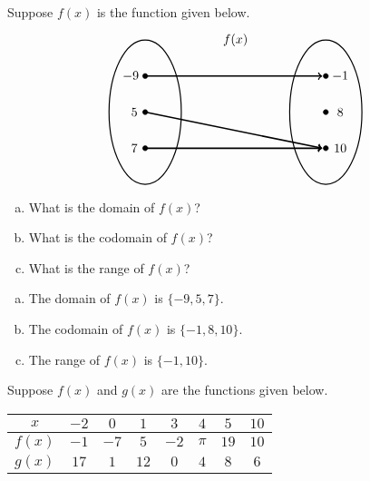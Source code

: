 \documentclass[11pt,letterpaper]{article}
\begin{document}
 Suppose $f(x)$ is the function given below.
	\[
	\begin{tikzpicture}
	\node at (2.5,2) {$f(x)$};
	\draw[line width=0.03cm] (0,0) circle (1 and 2);
	\draw[line width=0.03cm] (5,0) circle (1 and 2);
	
	\draw[fill=black] (0,1) circle (0.07);
	\draw[fill=black] (0,0) circle (0.07);
	\draw[fill=black] (0,-1) circle (0.07);
	
	\draw[fill=black] (5,1) circle (0.07);
	\draw[fill=black] (5,0) circle (0.07);
	\draw[fill=black] (5,-1) circle (0.07);
	
	\draw[line width=0.04cm,->] (0,1) -- (4.9,1);
	\draw[line width=0.04cm,->] (0,0) -- (4.9,-1);
	\draw[line width=0.04cm,->] (0,-1) -- (4.9,-1);
	
	\node at (-0.4,1) {$-9$};
	\node at (-0.3,0) {$5$};
	\node at (-0.3,-1) {$7$};
	
	\node at (5.4,1) {$-1$};
	\node at (5.4,0) {$8$};
	\node at (5.4,-1) {$10$};
	\end{tikzpicture}
	\]

\begin{enumerate}[(a)]
\item What is the domain of $f(x)$?
\item What is the codomain of $f(x)$?
\item What is the range of $f(x)$?
\end{enumerate} \pspace

\sol
{\itshape
\begin{enumerate}[(a)]
\item The domain of $f(x)$ is $\{ -9, 5, 7 \}$.

\item The codomain of $f(x)$ is $\{ -1, 8, 10 \}$.

\item The range of $f(x)$ is $\{ -1, 10 \}$. 
\end{enumerate}
}





\newpage





 Suppose $f(x)$ and $g(x)$ are the functions given below. 
        \begin{table}[!ht]
        \centering
        \begin{tabular}{| c || c | c | c | c | c | c | c |} \hline
	$x$ & $-2$ & $0$ & $1$ & $3$ & $4$ & $5$ & $10$ \\ \hline
	$f(x)$ & $-1$ & $-7$ & $5$ & $-2$ & $\pi$ & $19$ & $10$ \\ \hline
	$g(x)$ & $17$ & $1$ & $12$ & $0$ & $4$ & $8$ & $6$ \\ \hline
        \end{tabular}
        \end{table}
\end{document}
